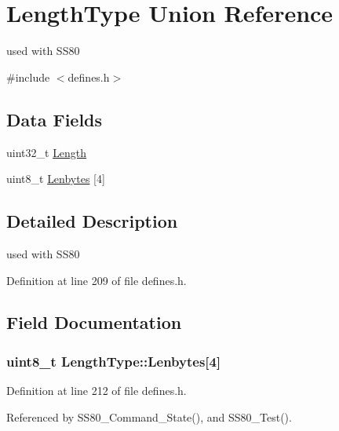 \hypertarget{unionLengthType}{}\section{Length\+Type Union Reference}
\label{unionLengthType}


used with S\+S80  




{\ttfamily \#include $<$defines.\+h$>$}

\subsection*{Data Fields}
\begin{DoxyCompactItemize}
\item 
uint32\+\_\+t \hyperlink{unionLengthType_a27186a51a0bcb9e93e44b9f1e49e5f27}{Length}
\item 
uint8\+\_\+t \hyperlink{unionLengthType_a51f62c21aa27a0cbe1c99de05e33fcf7}{Lenbytes} \mbox{[}4\mbox{]}
\end{DoxyCompactItemize}


\subsection{Detailed Description}
used with S\+S80 

Definition at line 209 of file defines.\+h.



\subsection{Field Documentation}
\subsubsection[{\texorpdfstring{Lenbytes}{Lenbytes}}]{\setlength{\rightskip}{0pt plus 5cm}uint8\+\_\+t Length\+Type\+::\+Lenbytes\mbox{[}4\mbox{]}}\hypertarget{unionLengthType_a51f62c21aa27a0cbe1c99de05e33fcf7}{}\label{unionLengthType_a51f62c21aa27a0cbe1c99de05e33fcf7}


Definition at line 212 of file defines.\+h.



Referenced by S\+S80\+\_\+\+Command\+\_\+\+State(), and S\+S80\+\_\+\+Test().

